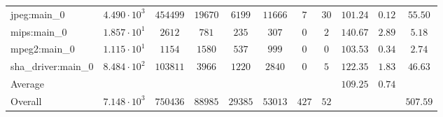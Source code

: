 \begin{tabular}{|l|c|c|c|c|c|c|c|c|c|c|}
jpeg:main\_0            & $ 4.490 \cdot 10^{3}  $ & $ 454499 $ & $ 19670 $ & $ 6199  $ & $ 11666 $ & $ 7   $ & $ 30 $ & $ 101.24      $ & $ 0.12    $ & $ 55.50   $ \\
mips:main\_0            & $ 1.857 \cdot 10^{1}  $ & $ 2612   $ & $ 781   $ & $ 235   $ & $ 307   $ & $ 0   $ & $ 2  $ & $ 140.67      $ & $ 2.89    $ & $ 5.18    $ \\
mpeg2:main\_0           & $ 1.115 \cdot 10^{1}  $ & $ 1154   $ & $ 1580  $ & $ 537   $ & $ 999   $ & $ 0   $ & $ 0  $ & $ 103.53      $ & $ 0.34    $ & $ 2.74    $ \\
sha\_driver:main\_0     & $ 8.484 \cdot 10^{2}  $ & $ 103811 $ & $ 3966  $ & $ 1220  $ & $ 2840  $ & $ 0   $ & $ 5  $ & $ 122.35      $ & $ 1.83    $ & $ 46.63   $ \\
\hline
Average                 & $                     $ & $        $ & $       $ & $       $ & $       $ & $     $ & $    $ & $ 109.25      $ & $ 0.74    $ & $         $ \\
\hline
Overall                 & $ 7.148 \cdot 10^{3}  $ & $ 750436 $ & $ 88985 $ & $ 29385 $ & $ 53013 $ & $ 427 $ & $ 52 $ & $             $ & $         $ & $ 507.59  $ \\
\hline
\end{tabular}
